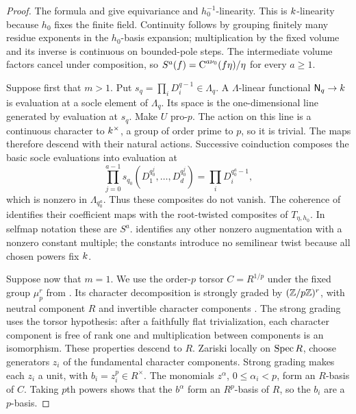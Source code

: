 \begin{proof}
The formula and  give equivariance and
$h_0^{-1}$-linearity.  This is $k$-linearity because $h_0$ fixes the
finite field.  Continuity follows by grouping finitely many residue
exponents in the $h_0$-basis expansion; multiplication by the fixed
volume and its inverse is continuous on bounded-pole steps.
The intermediate volume factors cancel under composition, so
$S^a(f)=\operatorname{C}^{a\nu_0}(f\eta)/\eta$ for every $a\geq1$.

Suppose first that $m>1$.  Put
$s_q=\prod_iD_i^{q-1}\in\Lambda_q$.  A $\Lambda$-linear functional
$\mathsf N_q\to k$ is evaluation at a socle element of $\Lambda_q$.
Its space is the one-dimensional line generated by evaluation at
$s_q$.  Make $U$ pro-$p$.  The action on this line is a continuous
character to $k^\times$, a group of order prime to $p$, so it is
trivial.  The maps therefore descend with their natural actions.
Successive coinduction composes the basic socle evaluations into
evaluation at
\[
 \prod_{j=0}^{a-1}s_{q_0}(D_1^{q_0^j},\ldots,D_d^{q_0^j})
       =\prod_iD_i^{q_0^a-1},
\]
which is nonzero in $\Lambda_{q_0^a}$.  Thus these composites do not
vanish.  The coherence of  identifies their
coefficient maps with the root-twisted composites of
$T_{\eta,h_0}$.  In selfmap notation these are $S^a$.
 identifies any other nonzero augmentation
with a nonzero constant multiple; the constants introduce no
semilinear twist because all chosen powers fix $k$.

Suppose now that $m=1$. We use the order-$p$ torsor
$C=R^{1/p}$ under the fixed group $\mu_p^r$ from
. Its character decomposition is strongly
graded by $(\mathbb Z/p\mathbb Z)^r$, with neutral component $R$ and invertible
character components
\citep[Theorem~12.12 and Remark~12.13]{milne2017}.
The strong grading uses the torsor hypothesis: after a faithfully
flat trivialization, each character component is free of rank one
and multiplication between components is an isomorphism. These
properties descend to $R$.
Zariski locally on $\operatorname{Spec} R$, choose generators $z_i$ of the
fundamental character components. Strong grading makes each $z_i$
a unit, with $b_i=z_i^p\in R^\times$. The monomials $z^\alpha$,
$0\leq\alpha_i<p$, form an $R$-basis of $C$. Taking $p$th powers
shows that the $b^\alpha$ form an $R^p$-basis of $R$, so the $b_i$
are a $p$-basis.


\end{proof}
